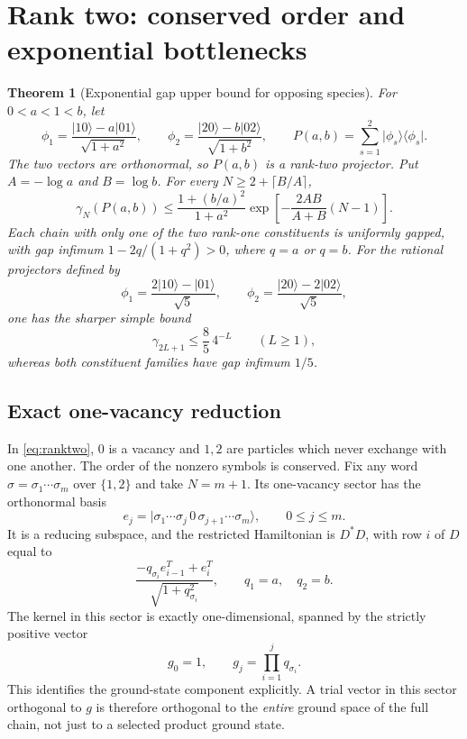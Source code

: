 \documentclass[11pt,a4paper]{article}
\newtheorem{theorem}{Theorem}[section]
\theoremstyle{remark}\newtheorem{remark}[theorem]{Remark}
\newcommand{\ket}[1]{\lvert #1\rangle}
\newcommand{\bra}[1]{\langle #1\rvert}
\begin{document}
\section{Rank two: conserved order and exponential bottlenecks}\label{sec:ranktwo}
\begin{theorem}[Exponential gap upper bound for opposing species]\label{thm:ranktwo-main}
For $0<a<1<b$, let
\begin{equation}\label{eq:ranktwo}
 \phi_1=\frac{\ket{10}-a\ket{01}}{\sqrt{1+a^2}},\qquad
 \phi_2=\frac{\ket{20}-b\ket{02}}{\sqrt{1+b^2}},\qquad
 P(a,b)=\sum_{s=1}^2\ket{\phi_s}\bra{\phi_s}.
\end{equation}
The two vectors are orthonormal, so $P(a,b)$ is a rank-two projector. Put
$A=-\log a$ and $B=\log b$. For every $N\ge 2+\lceil B/A\rceil$,
\begin{equation}\label{eq:ranktwo-exp}
 \gamma_N(P(a,b))\le
 \frac{1+(b/a)^2}{1+a^2}
 \exp\left[-\frac{2AB}{A+B}(N-1)\right].
\end{equation}
Each chain with only one of the two rank-one constituents is uniformly gapped, with gap infimum $1-2q/(1+q^2)>0$, where $q=a$ or $q=b$.
For the rational projectors defined by
\begin{equation}\label{eq:rational-two}
 \phi_1=\frac{2\ket{10}-\ket{01}}{\sqrt5},\qquad
 \phi_2=\frac{\ket{20}-2\ket{02}}{\sqrt5},
\end{equation}
one has the sharper simple bound
\begin{equation}\label{eq:rational-exp}
 \gamma_{2L+1}\le\frac85\,4^{-L}\qquad(L\ge1),
\end{equation}
whereas both constituent families have gap infimum $1/5$.
\end{theorem}
\subsection{Exact one-vacancy reduction}
In \eqref{eq:ranktwo}, $0$ is a vacancy and $1,2$ are particles which never exchange with one another. The order of the nonzero symbols is conserved. Fix any word $\sigma=\sigma_1\cdots\sigma_m$ over $\{1,2\}$ and take $N=m+1$. Its one-vacancy sector has the orthonormal basis
\[
 e_j=\ket{\sigma_1\cdots\sigma_j\,0\,\sigma_{j+1}\cdots\sigma_m},
 \qquad0\le j\le m.
\]
It is a reducing subspace, and the restricted Hamiltonian is $D^*D$, with row $i$ of $D$ equal to
\begin{equation}\label{eq:vacancyD}
 \frac{-q_{\sigma_i}e_{i-1}^T+e_i^T}{\sqrt{1+q_{\sigma_i}^2}},
 \qquad q_1=a,\quad q_2=b.
\end{equation}
The kernel in this sector is exactly one-dimensional, spanned by the strictly positive vector
\begin{equation}\label{eq:g}
 g_0=1,\qquad g_j=\prod_{i=1}^j q_{\sigma_i}.
\end{equation}
This identifies the ground-state component explicitly. A trial vector in this sector orthogonal to $g$ is therefore orthogonal to the \emph{entire} ground space of the full chain, not just to a selected product ground state.
\end{document}
